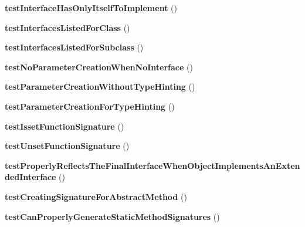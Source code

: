 \begin{DoxyCompactItemize}
\item 
\hypertarget{class_test_of_reflection_a4c57e6dab405439e47839e3ce3d0365a}{
{\bfseries testInterfaceHasOnlyItselfToImplement} ()}
\label{class_test_of_reflection_a4c57e6dab405439e47839e3ce3d0365a}

\item 
\hypertarget{class_test_of_reflection_a416f62ddf25b7ed4035f9992487c2a5b}{
{\bfseries testInterfacesListedForClass} ()}
\label{class_test_of_reflection_a416f62ddf25b7ed4035f9992487c2a5b}

\item 
\hypertarget{class_test_of_reflection_a9d557f3cbdead1c9cce297d4eb846a7d}{
{\bfseries testInterfacesListedForSubclass} ()}
\label{class_test_of_reflection_a9d557f3cbdead1c9cce297d4eb846a7d}

\item 
\hypertarget{class_test_of_reflection_ae6242f6af520d497c552c15608851458}{
{\bfseries testNoParameterCreationWhenNoInterface} ()}
\label{class_test_of_reflection_ae6242f6af520d497c552c15608851458}

\item 
\hypertarget{class_test_of_reflection_afcd334fbeb5b1aba0504dcea6a9402eb}{
{\bfseries testParameterCreationWithoutTypeHinting} ()}
\label{class_test_of_reflection_afcd334fbeb5b1aba0504dcea6a9402eb}

\item 
\hypertarget{class_test_of_reflection_af9c0e65bab4ce2f9500fe780cb4afe2b}{
{\bfseries testParameterCreationForTypeHinting} ()}
\label{class_test_of_reflection_af9c0e65bab4ce2f9500fe780cb4afe2b}

\item 
\hypertarget{class_test_of_reflection_a99c2c6f7ee6876c9f123aef07b50ddcc}{
{\bfseries testIssetFunctionSignature} ()}
\label{class_test_of_reflection_a99c2c6f7ee6876c9f123aef07b50ddcc}

\item 
\hypertarget{class_test_of_reflection_ae69dd2f5ed64b404461743cb6f9a9401}{
{\bfseries testUnsetFunctionSignature} ()}
\label{class_test_of_reflection_ae69dd2f5ed64b404461743cb6f9a9401}

\item 
\hypertarget{class_test_of_reflection_a1f7f19f556b4ad5549b97882f896f6b0}{
{\bfseries testProperlyReflectsTheFinalInterfaceWhenObjectImplementsAnExtendedInterface} ()}
\label{class_test_of_reflection_a1f7f19f556b4ad5549b97882f896f6b0}

\item 
\hypertarget{class_test_of_reflection_a7f6a48edf2cc04472dcbfc42aad773e1}{
{\bfseries testCreatingSignatureForAbstractMethod} ()}
\label{class_test_of_reflection_a7f6a48edf2cc04472dcbfc42aad773e1}

\item 
\hypertarget{class_test_of_reflection_aab0f5d0a198403cfcb87458ae2a2e369}{
{\bfseries testCanProperlyGenerateStaticMethodSignatures} ()}
\label{class_test_of_reflection_aab0f5d0a198403cfcb87458ae2a2e369}

\end{DoxyCompactItemize}


